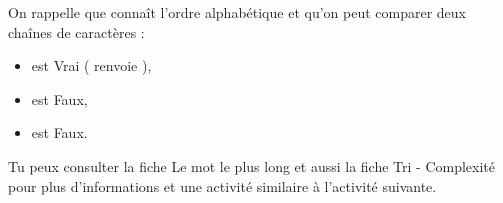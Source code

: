 \documentclass[11pt,class=report,crop=false]{standalone}
\begin{document}

\begin{cours}
On rappelle que \Python{} connaît l'ordre alphabétique et qu'on peut comparer deux chaînes de caractères :
\begin{itemize}
	\item \og{}\fg{} est \og{}Vrai\fg{} (\Python{} renvoie ),
	\item \og{}\fg{} est \og{}Faux\fg{},
	\item \og{}\fg{} est \og{}Faux\fg{}.
\end{itemize}

Tu peux consulter la fiche \og{}Le mot le plus long\fg{} et aussi la fiche \og{}Tri - Complexité\fg{} pour plus d'informations 
et une activité similaire à l'activité suivante.
\end{cours}


\end{document}
